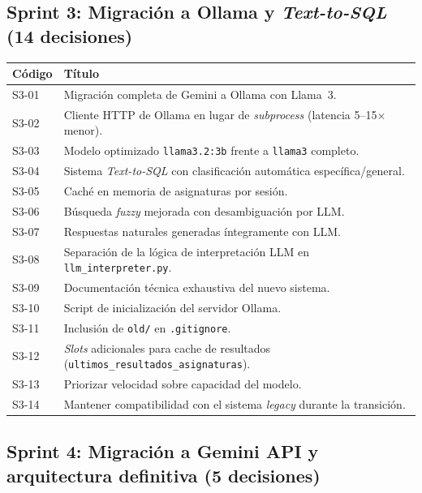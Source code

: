 \subsection*{Sprint 3: Migración a Ollama y \textit{Text-to-SQL} (14 decisiones)}

\begin{longtable}{|p{1.3cm}|>{\raggedright\arraybackslash}p{12cm}|}
\hline
\textbf{Código} & \textbf{Título} \\ \hline
S3-01 & Migración completa de Gemini a Ollama con Llama~3. \\ \hline
S3-02 & Cliente HTTP de Ollama en lugar de \textit{subprocess} (latencia 5--15$\times$ menor). \\ \hline
S3-03 & Modelo optimizado \texttt{llama3.2:3b} frente a \texttt{llama3} completo. \\ \hline
S3-04 & Sistema \textit{Text-to-SQL} con clasificación automática específica/general. \\ \hline
S3-05 & Caché en memoria de asignaturas por sesión. \\ \hline
S3-06 & Búsqueda \textit{fuzzy} mejorada con desambiguación por LLM. \\ \hline
S3-07 & Respuestas naturales generadas íntegramente con LLM. \\ \hline
S3-08 & Separación de la lógica de interpretación LLM en \texttt{llm\_interpreter.py}. \\ \hline
S3-09 & Documentación técnica exhaustiva del nuevo sistema. \\ \hline
S3-10 & Script de inicialización del servidor Ollama. \\ \hline
S3-11 & Inclusión de \texttt{old/} en \texttt{.gitignore}. \\ \hline
S3-12 & \textit{Slots} adicionales para cache de resultados (\texttt{ultimos\_resultados\_asignaturas}). \\ \hline
S3-13 & Priorizar velocidad sobre capacidad del modelo. \\ \hline
S3-14 & Mantener compatibilidad con el sistema \textit{legacy} durante la transición. \\ \hline
\end{longtable}

\subsection*{Sprint 4: Migración a Gemini API y arquitectura definitiva (5 decisiones)}

